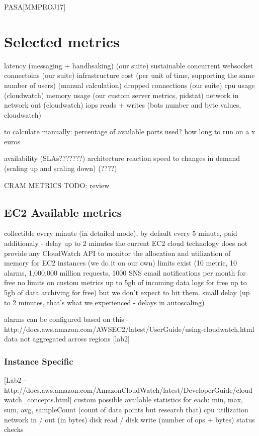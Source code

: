 \documentclass{uvamscse}
\begin{document}
PASA[MMPROJ17]

\section{Selected metrics}
latency (messaging + handhsaking) (our suite)
sustainable concurrent websocket connectoins (our suite)
infrastructure cost (per unit of time, supporting the same number of users) (manual calculation)
dropped connections (our suite)
cpu usage (cloudwatch)
memory usage (our custom server metrics, pidstat)
network in network out (cloudwatch)
iops reads + writes (bots number and byte values, cloudwatch)

to calculate manually:
percentage of available ports used?
how long to run on a x euros


availability (SLAs???????)
architecture reaction speed to changes in demand (scaling up and scaling down) (????)

CRAM METRICS
TODO: review

\subsection{EC2 Available metrics}
collectible every minute (in detailed mode), by default every 5 minute, paid additionaly - delay up to 2 minutes
the current EC2 cloud technology does not provide any CloudWatch API to monitor the allocation and utilization of memory for EC2 instances (we do it on our own)
limits exist (10 metric, 10 alarms, 1,000,000 million requests, 1000 SNS email notifications per month for free
no limits on custom metrics
up to 5gb of incoming data logs for free
up to 5gb of data archiving for free) but we don't expect to hit them.
small delay (up to 2 minutes, that's what we experienced - delays in autoscaling)

alarms can be configured based on this -  http://docs.aws.amazon.com/AWSEC2/latest/UserGuide/using-cloudwatch.html
data not aggregated across regions [lab2]

\subsubsection{Instance Specific}
[Lab2 - http://docs.aws.amazon.com/AmazonCloudWatch/latest/DeveloperGuide/cloudwatch\_concepts.html]
custom possible
available statistics for each: min, max, sum, avg, sampleCount (count of data points but research that)
cpu utilization
network in / out (in bytes)
disk read / disk write (number of ops + bytes)
status checks
\end{document}
